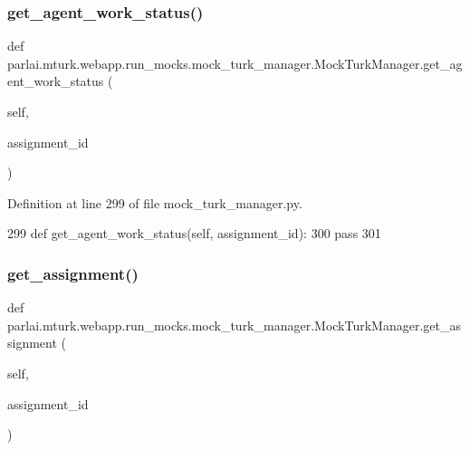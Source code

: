 \subsubsection{\texorpdfstring{get\+\_\+agent\+\_\+work\+\_\+status()}{get\_agent\_work\_status()}}
{\footnotesize\ttfamily def parlai.\+mturk.\+webapp.\+run\+\_\+mocks.\+mock\+\_\+turk\+\_\+manager.\+Mock\+Turk\+Manager.\+get\+\_\+agent\+\_\+work\+\_\+status (\begin{DoxyParamCaption}\item[{}]{self,  }\item[{}]{assignment\+\_\+id }\end{DoxyParamCaption})}



Definition at line 299 of file mock\+\_\+turk\+\_\+manager.\+py.


\begin{DoxyCode}
299     \textcolor{keyword}{def }get\_agent\_work\_status(self, assignment\_id):
300         \textcolor{keywordflow}{pass}
301 
\end{DoxyCode}
\mbox{\label{classparlai_1_1mturk_1_1webapp_1_1run__mocks_1_1mock__turk__manager_1_1MockTurkManager_a0f50539551f0049aa2061acf60d26e54}} 
\subsubsection{\texorpdfstring{get\+\_\+assignment()}{get\_assignment()}}
{\footnotesize\ttfamily def parlai.\+mturk.\+webapp.\+run\+\_\+mocks.\+mock\+\_\+turk\+\_\+manager.\+Mock\+Turk\+Manager.\+get\+\_\+assignment (\begin{DoxyParamCaption}\item[{}]{self,  }\item[{}]{assignment\+\_\+id }\end{DoxyParamCaption})}



